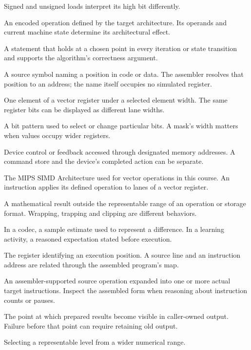 \begin{description}
        Signed and unsigned loads interpret its high bit differently.
  \item[Instruction] An encoded operation defined by the target architecture. Its operands and current machine state determine its architectural effect.
  \item[Invariant] A statement that holds at a chosen point in every iteration or
        state transition and supports the algorithm's correctness argument.
  \item[Label] A source symbol naming a position in code or data. The assembler resolves that position to an address; the name itself occupies no simulated register.
  \item[Lane] One element of a vector register under a selected element width.
        The same register bits can be displayed as different lane widths.
  \item[Mask] A bit pattern used to select or change particular bits. A mask's
        width matters when values occupy wider registers.
  \item[Memory-mapped I/O] Device control or feedback accessed through designated
        memory addresses. A command store and the device's completed action can be separate.
  \item[MSA] The MIPS SIMD Architecture used for vector operations in this course.
        An instruction applies its defined operation to lanes of a vector register.
  \item[Overflow] A mathematical result outside the representable range of an
        operation or storage format. Wrapping, trapping and clipping are different behaviors.
  \item[Prediction] In a codec, a sample estimate used to represent a difference.
        In a learning activity, a reasoned expectation stated before execution.
  \item[Program counter] The register identifying an execution position. A source
        line and an instruction address are related through the assembled program's map.
  \item[Pseudoinstruction] An assembler-supported source operation expanded into one or more actual target instructions. Inspect the assembled form when reasoning about instruction counts or pauses.
  \item[Publication] The point at which prepared results become visible in
        caller-owned output. Failure before that point can require retaining old output.
  \item[Quantization] Selecting a representable level from a wider numerical range.

\end{description}
